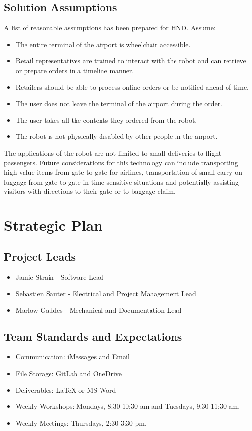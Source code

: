\documentclass[letterpaper,fleqn,oneside]{template}
\begin{document}
\subsection{Solution Assumptions}

A list of reasonable assumptions has been prepared for HND. Assume:
\begin{itemize}
    \item The entire terminal of the airport is wheelchair accessible.
    \item Retail representatives are trained to interact with the robot and can retrieve or prepare orders in a timeline manner. 
    \item Retailers should be able to process online orders or be notified ahead of time. 
    \item The user does not leave the terminal of the airport during the order. 
    \item The user takes all the contents they ordered from the robot. 
    \item  The robot is not physically disabled by other people in the airport. 
\end{itemize}

The applications of the robot are not limited to small deliveries to flight passengers. Future considerations for this technology can include transporting high value items from gate to gate for airlines, transportation of small carry-on luggage from gate to gate in time sensitive situations and potentially assisting visitors with directions to their gate or to baggage claim.

\section{Strategic Plan}


\subsection{Project Leads}
\begin{itemize}
    \item Jamie Strain - Software Lead
    \item Sebastien Sauter - Electrical and Project Management Lead
    \item Marlow Gaddes - Mechanical and Documentation Lead
\end{itemize}
\subsection{Team Standards and Expectations}
\begin{itemize}
    \item Communication: iMessages and Email
    \item File Storage: GitLab and OneDrive
    \item Deliverables: LaTeX or MS Word
    \item Weekly Workshops: Mondays, 8:30-10:30 am and Tuesdays, 9:30-11:30 am.
    \item Weekly Meetings: Thursdays, 2:30-3:30 pm. 
\end{itemize}
\end{document}
